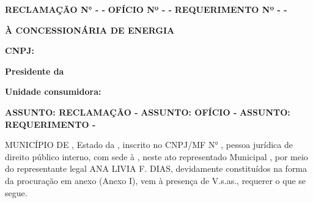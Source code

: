 \ifnum{}
\textbf{RECLAMAÇÃO N° \numReclamacao{} - \nomeMunicipioMaisculo{} - \siglaEstado{}}
\else
\ifnum{}
\textbf{OFÍCIO Nº \numReclamacao{} - \nomeMunicipioMaisculo{} - \siglaEstado{}}
\else
\textbf{REQUERIMENTO Nº \numReclamacao{} - \nomeMunicipioMaisculo{} - \siglaEstado{}}
\fi
\fi

\textbf{À CONCESSIONÁRIA DE ENERGIA \nomeConcessionaria{}}

\textbf{CNPJ: \cnpjConcessionaria{}}

\textbf{\presidenteConcessionaria{}}

\textbf{Presidente da \nomeConcessionaria{}}

\ifnum{}
\textbf{Unidade consumidora: \unidadeConsumidora{}}
\fi

\ifnum{}
\textbf{ASSUNTO: RECLAMAÇÃO - \tituloDocumento{}}
\else
\ifnum{}
\textbf{ASSUNTO: OFÍCIO - \tituloDocumento{}}
\else
\textbf{ASSUNTO: REQUERIMENTO - \tituloDocumento{}}
\fi
\fi

\vspace{0,25cm}

MUNICÍPIO DE \nomeMunicipioMaisculo{}, Estado da \nomeEstado{}, inscrito no CNPJ/MF N° \cnpjMunicipio{}, pessoa jurídica de direito público interno, com sede à \sedePrefeitura{}, neste ato representado \generoPrefeitura{} Municipal \nomePrefeito{}, por meio do representante legal ANA LIVIA F. DIAS, devidamente constituídos na forma da procuração em anexo (Anexo I), vem à presença de V.s.as., requerer o que se segue.
